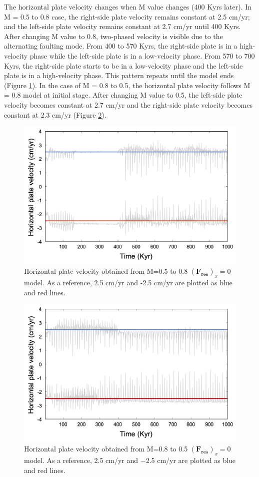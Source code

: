 \documentclass[letterpaper,12pt,notitle]{memphisthesis}                     %
\begin{document}
The horizontal plate velocity changes when M value changes (400 Kyrs later). In M = 0.5 to 0.8 case, the right-side plate velocity remains constant at 2.5 cm/yr; and the left-side plate velocity remains constant at 2.7 cm/yr until 400 Kyrs. After changing M value to 0.8, two-phased velocity is visible due to the alternating faulting mode. From 400 to 570 Kyrs, the right-side plate is in a high-velocity phase while the left-side plate is in a low-velocity phase. From 570 to 700 Kyrs, the right-side plate starts to be in a low-velocity phase and the left-side plate is in a high-velocity phase. This pattern repeats until the model ends (Figure \ref{fig:f005to08}). In the case of M = 0.8 to 0.5, the horizontal plate velocity follows M = 0.8 model at initial stage. After changing M value to 0.5, the left-side plate velocity becomes constant at 2.7 cm/yr and the right-side plate velocity becomes constant at 2.3 cm/yr (Figure \ref{fig:f008to05}).

\begin{figure}[!htb]
	\centering
	\includegraphics[width=0.9\linewidth]{./figs/f0m05to08.png}
	\caption{Horizontal plate velocity obtained from M=0.5 to 0.8 $(\boldsymbol{F_{res}})_x=0$ model. As a reference, 2.5 cm/yr and -2.5 cm/yr are plotted as blue and red lines.}
	\label{fig:f005to08}
\end{figure}
\begin{figure}[!htb]
	\centering
	\includegraphics[width=0.9\linewidth]{./figs/f0m08to05.png}
	\caption{Horizontal plate velocity obtained from M=0.8 to 0.5 $(\boldsymbol{F_{res}})_x=0$ model. As a reference, 2.5 cm/yr and $-$2.5 cm/yr are plotted as blue and red lines.}
	\label{fig:f008to05}
\end{figure}
\end{document}
